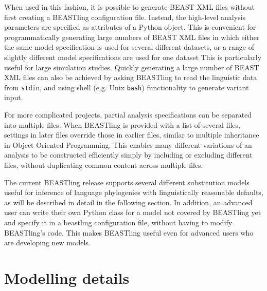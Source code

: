 \documentclass[twocolumn,10pt]{scrartcl}
\begin{document}
When used in this fashion, it is possible to generate BEAST XML files without first creating a BEASTling configuration file.  Instead, the high-level analysis parameters are specified as attributes of a Python object.  This is convenient for programmatically generating large numbers of BEAST XML files in which either the same model specification is used for several different datasets, or a range of slightly different model specifications are used for one dataset  This is particularly useful for large simulation studies. Quickly generating a large number of BEAST XML files can also be achieved by asking BEASTling to read the linguistic data from \texttt{stdin}, and using shell (e.g. Unix \texttt{bash}) functionality to generate variant input.

For more complicated projects, partial analysis specifications can be separated into multiple files.  When BEASTling is provided with a list of several files, settings in later files override those in earlier files, similar to multiple inheritance in Object Oriented Programming.  This enables many different variations of an analysis to be constructed efficiently simply by including or excluding different files, without duplicating common content across multiple files.

The current BEASTling release supports several different substitution models useful for inference of language phylogenies with linguistically reasonable defaults, as will be described in detail in the following section. In addition, an advanced user can write their own Python class for a model not covered by BEASTling yet and specify it in a beastling configuration file, without having to modify BEASTling's code.  This makes BEASTling useful even for advanced users who are developing new models.

\section{Modelling details}
\end{document}

